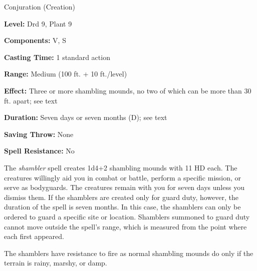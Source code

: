 
Conjuration (Creation)

\textbf{Level:} Drd 9, Plant 9

\textbf{Components:} V, S

\textbf{Casting Time:} 1 standard action

\textbf{Range:} Medium (100 ft. + 10 ft./level)

\textbf{Effect:} Three or more shambling mounds, no two of which can be more than 
30 ft. apart; see text

\textbf{Duration:} Seven days or seven months (D); see text

\textbf{Saving Throw:} None

\textbf{Spell Resistance:} No

The \textit{shambler} spell creates 1d4+2 shambling mounds with 11 HD each. The 
creatures willingly aid you in combat or battle, perform a specific mission, or 
serve as bodyguards. The creatures remain with you for seven days unless you dismiss 
them. If the shamblers are created only for guard duty, however, the duration of 
the spell is seven months. In this case, the shamblers can only be ordered to guard 
a specific site or location. Shamblers summoned to guard duty cannot move outside 
the spell's range, which is measured from the point where each first appeared. 

The shamblers have resistance to fire as normal shambling mounds do only if the 
terrain is rainy, marshy, or damp.

